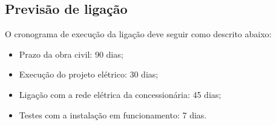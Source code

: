 \subsection{Previsão de ligação}

O cronograma de execução da ligação deve seguir como descrito abaixo:

\begin{itemize}
    \item Prazo da obra civil: 90 dias;
    \item Execução do projeto elétrico: 30 dias;
    \item Ligação com a rede elétrica da concessionária: 45 dias;
    \item Testes com a instalação em funcionamento: 7 dias.
\end{itemize}